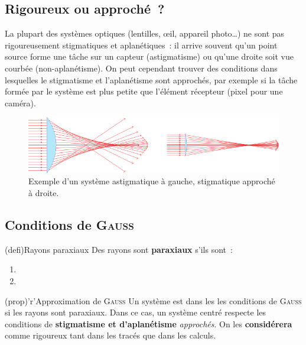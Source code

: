 \documentclass[../../main/main.tex]{subfiles}
\begin{document}
\subsection{Rigoureux ou approché~?}

La plupart des systèmes optiques (lentilles, œil, appareil photo…) ne sont pas
rigoureusement stigmatiques et aplanétiques~: il arrive souvent qu'un point
source forme une tâche sur un capteur (astigmatisme) ou qu'une droite soit vue
courbée (non-aplanétisme). On peut cependant trouver des conditions
dans lesquelles le stigmatisme et l'aplanétisme sont approchés, par exemple si
la tâche formée par le système est plus petite que l'élément récepteur (pixel
pour une caméra).

\begin{figure}[htbp]
	\centering
	\includegraphics[scale=.95]{stig}
	\caption{Exemple d'un système astigmatique à gauche, stigmatique approché à
		droite.}
	\label{fig:stig}
\end{figure}

\vspace{-15pt}
\subsection{Conditions de \textsc{Gauss}}

\begin{tcb*}[label=def:gausscond](defi){Rayons paraxiaux}
  Des rayons sont \textbf{paraxiaux} s'ils sont~:
  \begin{enumerate}
    \item {}
    \item {}
  \end{enumerate}
\end{tcb*}
\begin{tcb*}[label=prop:gaussprop](prop)'r'{Approximation de \textsc{Gauss}}
  Un système est dans les les conditions de \textsc{Gauss} si les rayons sont
  paraxiaux. Dans ce cas, un système centré respecte les conditions de
  \textbf{stigmatisme et d'aplanétisme} \textit{approchés}. On
  les \textbf{considérera} comme rigoureux tant dans les tracés que dans les
  calculs.
\end{tcb*}
\vspace{-15pt}
\end{document}
